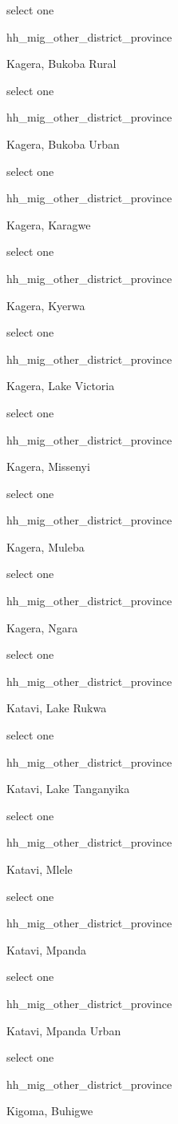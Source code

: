 \documentclass[]{article}
\begin{document}
select one

hh\_mig\_other\_district\_province

Kagera, Bukoba Rural

select one

hh\_mig\_other\_district\_province

Kagera, Bukoba Urban

select one

hh\_mig\_other\_district\_province

Kagera, Karagwe

select one

hh\_mig\_other\_district\_province

Kagera, Kyerwa

select one

hh\_mig\_other\_district\_province

Kagera, Lake Victoria

select one

hh\_mig\_other\_district\_province

Kagera, Missenyi

select one

hh\_mig\_other\_district\_province

Kagera, Muleba

select one

hh\_mig\_other\_district\_province

Kagera, Ngara

select one

hh\_mig\_other\_district\_province

Katavi, Lake Rukwa

select one

hh\_mig\_other\_district\_province

Katavi, Lake Tanganyika

select one

hh\_mig\_other\_district\_province

Katavi, Mlele

select one

hh\_mig\_other\_district\_province

Katavi, Mpanda

select one

hh\_mig\_other\_district\_province

Katavi, Mpanda Urban

select one

hh\_mig\_other\_district\_province

Kigoma, Buhigwe
\end{document}
